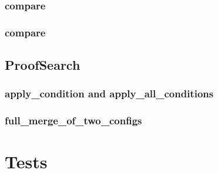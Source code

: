 \subsubsection{compare}
\subsubsection{compare}


\subsection{ProofSearch}
\subsubsection{apply\_condition and apply\_all\_conditions}
\subsubsection{full\_merge\_of\_two\_configs}

\section{Tests}
